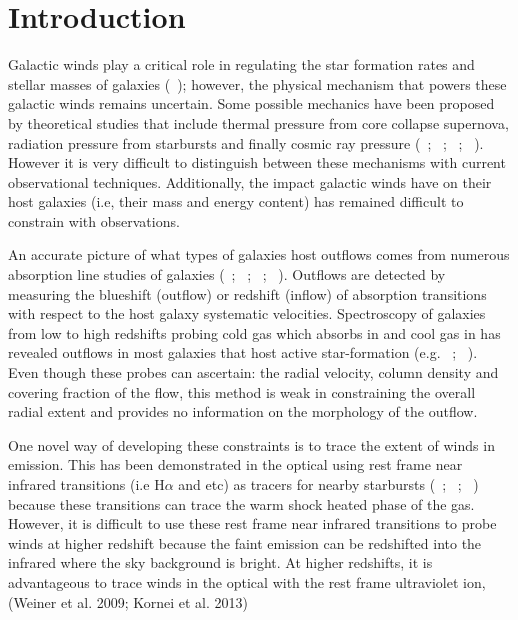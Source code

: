 \documentclass[twocolumn]{aastex61}
\newcommand{\citeth}[1]{(\citeauthor{#1}\ \citeyear{#1})}
\newcommand{\citethnop}[1]{\citeauthor{#1}\ \citeyear{#1}}
\begin{document}
\section{Introduction}\label{sec:intro}
Galactic winds play a critical role in regulating the star formation rates and stellar masses of galaxies \citeth{Werk_2014}; however, the physical mechanism that powers these galactic winds remains uncertain. Some possible mechanics have been proposed by theoretical studies that include thermal pressure from core collapse supernova, radiation pressure from starbursts and finally cosmic ray pressure (\citethnop{Larson_1974}; \citethnop{Chevalier_1985}; \citethnop{Springel_2003}; \citethnop{Sugahara_2017}). However it is very difficult to distinguish between these mechanisms with current observational techniques. Additionally, the impact galactic winds have on their host galaxies (i.e, their mass and energy content) has remained difficult to constrain with observations.

An accurate picture of what types of galaxies host outflows comes from numerous absorption line studies of galaxies (\citethnop{Veilleux2005}; \citethnop{Weiner2009}; \citethnop{Martin2012}; \citethnop{Rubin_2014}). Outflows are detected by measuring the blueshift (outflow) or redshift (inflow) of absorption transitions with respect to the host galaxy systematic velocities. Spectroscopy of galaxies from low to high redshifts probing cold gas which absorbs in  and cool gas in  has revealed outflows in most galaxies that host active star-formation (e.g. \citethnop{Martin2012}; \citethnop{Rubin_2014}). Even though these probes can ascertain: the radial velocity, column density and covering fraction of the flow, this method is weak in constraining the overall radial extent and provides no information on the morphology of the outflow.

One novel way of developing these constraints is to trace the extent of winds in emission. This has been demonstrated in the optical using rest frame near infrared transitions (i.e H$\alpha$ and  etc) as tracers for nearby starbursts (\citethnop{Matsubayashi2009}; \citethnop{Veilleux2009}; \citethnop{Tripp2011}) because these transitions can trace the warm shock heated phase of the gas. However, it is difficult to use these rest frame near infrared transitions to probe winds at higher redshift because the faint emission can be redshifted into the infrared where the sky background is bright. At higher redshifts, it is advantageous to trace winds in the optical with the rest frame ultraviolet ion,  (Weiner et al. 2009; Kornei et al. 2013)\nocite{Weiner2009, Kornei2013}
\end{document}
